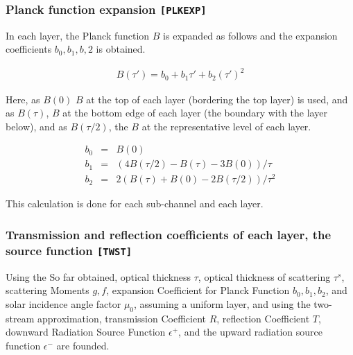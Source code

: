 \hypertarget{planck-function-expansion-plkexp}{%
\subsubsection{\texorpdfstring{Planck function expansion
\texttt{{[}PLKEXP{]}}}{Planck function expansion {[}PLKEXP{]}}}
\label{planck-function-expansion-moduleplkexp}}

In each layer, the Planck function \(B\) is expanded as follows and the 
expansion coefficients \(b_0, b_1, b,2\) is obtained. 

\begin{eqnarray}
  B(\tau') = b_0 + b_1 \tau' + b_2 \left(\tau'\right)^2
\end{eqnarray}

 Here, as \(B(0)\) \(B\) at the top of each layer (bordering the top layer) 
is used, and as \(B(\tau)\), \(B\) at the bottom edge of each layer 
(the boundary with the layer below), and as \(B(\tau/2)\), the \(B\) at 
the representative level of each layer.

\begin{eqnarray}
  b_0 & = & B(0) \nonumber \\
  b_1 & = & ( 4B(\tau/2) - B(\tau) - 3B(0) )/\tau  \\
  b_2 & = & 2 ( B(\tau) + B(0) - 2B(\tau/2) )/\tau^2  \nonumber
\end{eqnarray}

This calculation is done for each sub-channel and each layer.

\hypertarget{transmission-and-reflection-coefficients-of-each-layer-the-source-function-twst}{%
\subsubsection{\texorpdfstring{Transmission and reflection coefficients
of each layer, the source function
\texttt{{[}TWST{]}}}{Transmission and reflection coefficients of each layer, 
the source function {[}TWST{]}}}
\label{transmission-and-reflection-coefficients-of-each-layer-the-source-function-moduletwst}}

Using the So far obtained, optical thickness \(\tau\), optical thickness of
scattering \(\tau^s\), scattering Moments \(g, f\), expansion
Coefficient for Planck Function \(b_0, b_1, b_2\), and solar
incidence angle factor \(\mu_0\), assuming a uniform layer, and using
the two-stream approximation, transmission Coefficient \(R\), reflection
Coefficient \(T\), downward Radiation Source Function \(\epsilon^+\), and 
the upward radiation source function \(\epsilon^-\) are founded.

